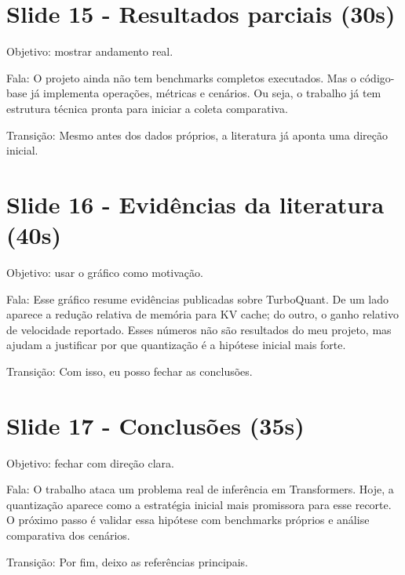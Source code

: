 \section{Slide 15 - Resultados parciais (30s)}


Objetivo: mostrar andamento real.






Fala: O projeto ainda não tem benchmarks completos executados. Mas o código-base já implementa operações, métricas e cenários. Ou seja, o trabalho já tem estrutura técnica pronta para iniciar a coleta comparativa.




Transição: Mesmo antes dos dados próprios, a literatura já aponta uma direção inicial.



\section{Slide 16 - Evidências da literatura (40s)}


Objetivo: usar o gráfico como motivação.






Fala: Esse gráfico resume evidências publicadas sobre TurboQuant. De um lado aparece a redução relativa de memória para KV cache; do outro, o ganho relativo de velocidade reportado. Esses números não são resultados do meu projeto, mas ajudam a justificar por que quantização é a hipótese inicial mais forte.




Transição: Com isso, eu posso fechar as conclusões.



\section{Slide 17 - Conclusões (35s)}


Objetivo: fechar com direção clara.






Fala: O trabalho ataca um problema real de inferência em Transformers. Hoje, a quantização aparece como a estratégia inicial mais promissora para esse recorte. O próximo passo é validar essa hipótese com benchmarks próprios e análise comparativa dos cenários.




Transição: Por fim, deixo as referências principais.



